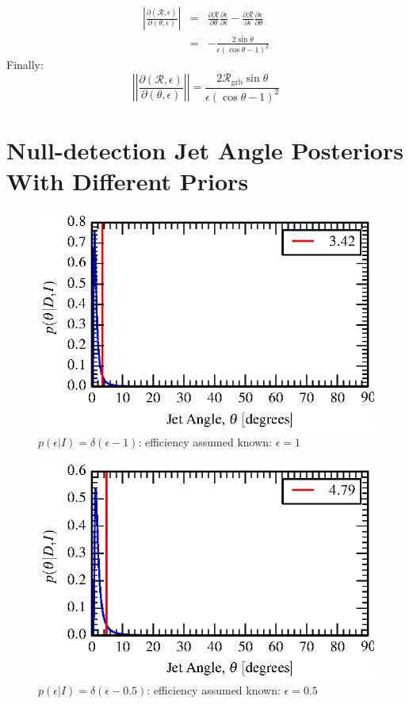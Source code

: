 \documentclass[nofootinbib]{revtex4}
\newcommand{\grbrate}{{{\mathcal R}_{\mathrm{grb}}}}
\newcommand{\cbcrate}{{{\mathcal R}}}
\begin{document}
\begin{eqnarray}
\left\lvert
\frac{\partial(\cbcrate,\epsilon)}{\partial(\theta,\epsilon)}
\right\rvert & = & \frac{\partial \cbcrate}{\partial \theta}
\frac{\partial \epsilon}{\partial \epsilon} - \frac{\partial \cbcrate}{\partial
\epsilon}\frac{\partial \epsilon}{\partial \theta} \\
& = & -\frac{2\sin\theta}{\epsilon(\cos\theta-1)^2}
\end{eqnarray}
%
Finally:
\begin{equation}
\left\lvert\left\lvert
\frac{\partial(\cbcrate,\epsilon)}{\partial(\theta,\epsilon)}
\right\rvert\right\rvert = \frac{2\grbrate\sin\theta}{\epsilon(\cos\theta-1)^2} 
\end{equation}

\section{Null-detection Jet Angle Posteriors With Different Priors}
\begin{figure}[h!]
\includegraphics{jet_angle_posterior_s6UL_TEST_deltaEffPrior-1.0.eps}
\caption{$p(\epsilon|I)=\delta(\epsilon-1)$: efficiency assumed known:
$\epsilon=1$}
\end{figure}

\begin{figure}[h!]
\includegraphics{jet_angle_posterior_s6UL_TEST_deltaEffPrior-0.5.eps}
\caption{$p(\epsilon|I)=\delta(\epsilon-0.5)$: efficiency assumed known:
$\epsilon=0.5$}
\end{figure}
\end{document}
